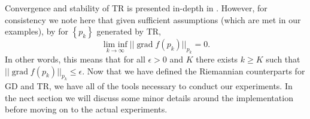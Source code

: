 Convergence and stability of TR is presented in-depth in \cite[p.~147]{Boumal2023}. However, for consistency we note here that given sufficient assumptions (which are met in our examples), by \cite[Cor.~6.24]{Boumal2023} for $\left\{ p_{k} \right\}$ generated by TR,
%
\begin{equation*}
\operatorname*{lim~inf}_{ k \to \infty }\lvert \lvert \operatorname{grad}f(p_{k}) \rvert  \rvert _{p_{k}}=0.
\end{equation*}
%
In other words, this means that for all $\epsilon>0$ and $K$ there exists $k\geq K$ such that $\lvert \lvert \operatorname{grad}f(p_{k}) \rvert \rvert_{p_{k}}\leq\epsilon$. 
Now that we have defined the Riemannian counterparts for GD and TR, we have all of the tools necessary to conduct our experiments. In the nect section we will discuss some minor details around the implementation before moving on to the actual experiments.